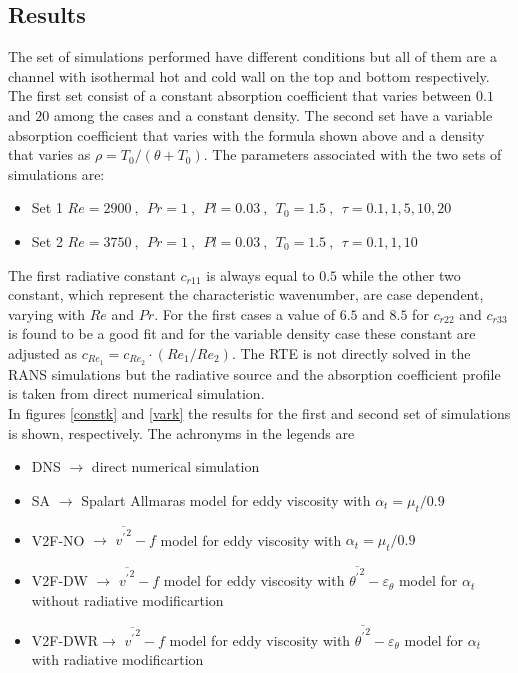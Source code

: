 \documentclass[10pt]{article}
\def\tp{\overline{{\theta^\prime}^2}}
\def\et{{\varepsilon_{\theta}}}
\begin{document}
\subsection*{Results}
The set of simulations performed have different conditions but all of them are a channel with isothermal hot and cold wall on the top and bottom respectively. The first set consist of a constant absorption coefficient that varies between $0.1$ and $20$ among the cases and a constant density. The second set have a variable absorption coefficient that varies with the formula shown above and a density that varies as $\rho = T_0/(\theta+T_0)$. The parameters associated with the two sets of simulations are:
\begin{itemize}
\item Set 1 $Re = 2900 \ , \ \ Pr = 1 \ , \ \ Pl = 0.03 \ , \ \ T_0 = 1.5 \ , \ \ \tau = 0.1,1,5,10,20$
\item Set 2 $Re = 3750 \ , \ \ Pr = 1 \ , \ \ Pl = 0.03 \ , \ \ T_0 = 1.5 \ , \ \ \tau = 0.1,1,10$
\end{itemize}
The first radiative constant $c_{r11}$ is always equal to $0.5$ while the other two constant, which represent the characteristic wavenumber, are case dependent, varying with $Re$ and $Pr$. For the first cases a value of $6.5$ and $8.5$ for $c_{r22}$ and $c_{r33}$ is found to be a good fit and for the variable density case these constant are adjusted as $c_{Re_1} = c_{Re_2} \cdot (Re_1/Re_2)$. The RTE is not directly solved in the RANS simulations but the radiative source and the absorption coefficient profile is taken from direct numerical simulation.\\ 
In figures \ref{constk} and \ref{vark} the results for the first and second set of simulations is shown, respectively. The achronyms in the legends are 
\begin{itemize}
\item DNS    $\rightarrow$ direct numerical simulation 
\item SA     $\rightarrow$ Spalart Allmaras model for eddy viscosity with $\alpha_{t} = \mu_t / 0.9$
\item V2F-NO $\rightarrow$ $\overline{{v^\prime}^2} - f$ model for eddy viscosity with $\alpha_{t} = \mu_t / 0.9$
\item V2F-DW $\rightarrow$ $\overline{{v^\prime}^2} - f$ model for eddy viscosity with $\tp - \et$ model for $\alpha_t$ without radiative modificartion
\item V2F-DWR$\rightarrow$ $\overline{{v^\prime}^2} - f$ model for eddy viscosity with $\tp - \et$ model for $\alpha_t$ with radiative modificartion
\end{itemize}
\end{document}
